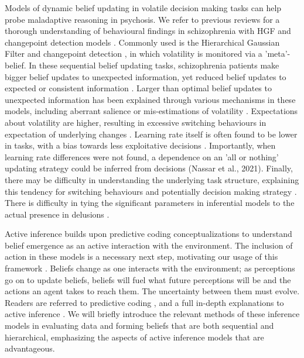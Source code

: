 \documentclass{article}
\begin{document}
Models of dynamic belief updating in volatile decision making tasks can help probe maladaptive reasoning in psychosis. We refer to previous reviews for a thorough understanding of behavioural findings in schizophrenia with HGF and changepoint detection models \citep{ashinoff2022rethinking, katthagen2022models, gibbs-dean2023belief, goodwin2025predictive}. Commonly used is the Hierarchical Gaussian Filter \citep{mathys2011} and changepoint detection \citep{nassar2010}, in which volatility is monitored via a 'meta'-belief. In these sequential belief updating tasks, schizophrenia patients make bigger belief updates to unexpected information, yet reduced belief updates to expected or consistent information \citep{ashinoff2022}. Larger than optimal belief updates to unexpected information has been explained through various mechanisms in these models, including aberrant salience \citep{Adams2018} or mis-estimations of volatility \citep{cole2020}. Expectations about volatility are higher, resulting in excessive switching behaviours in expectation of underlying changes \citep{gibbs-dean2023belief}. Learning rate itself is often found to be lower in tasks, with a bias towards less exploitative decisions \citep{gibbs-dean2023belief}. Importantly, when learning rate differences were not found, a dependence on an 'all or nothing' updating strategy could be inferred from decisions (Nassar et al., 2021). Finally, there may be difficulty in understanding the underlying task structure, explaining this tendency for switching behaviours and potentially decision making strategy \citep{schlagenhauf2014striatal}. There is difficulty in tying the significant parameters in inferential models to the actual presence in delusions \citep{ashinoff2022rethinking}.

Active inference builds upon predictive coding conceptualizations to understand belief emergence as an active interaction with the environment. The inclusion of action in these models is a necessary next step, motivating our usage of this framework \citep{sterzer2018}. Beliefs change as one interacts with the environment; as perceptions go on to update beliefs, beliefs will fuel what future perceptions will be and the actions an agent takes to reach them. The uncertainty between them must evolve. Readers are referred to predictive coding \citep{millidge2022predictive}, and a full in-depth explanations to active inference \citep{dacosta2023reward, friston2016active}. We will briefly introduce the relevant methods of these inference models in evaluating data and forming beliefs that are both sequential and hierarchical, emphasizing the aspects of active inference models that are advantageous.
\end{document}
